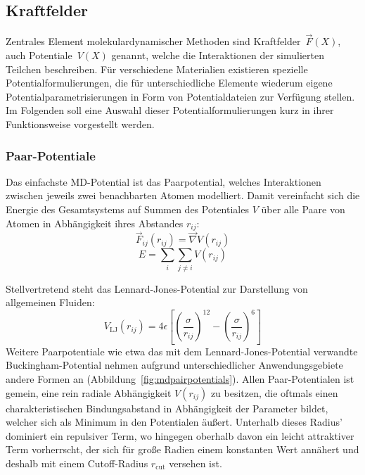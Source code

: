\subsection{Kraftfelder}
\label{mdforcefields}

Zentrales Element molekulardynamischer Methoden sind Kraftfelder~$\vec F(X)$, auch Potentiale~$V(X)$ genannt, welche die Interaktionen der simulierten Teilchen beschreiben.
Für verschiedene Materialien existieren spezielle Potentialformulierungen, die für unterschiedliche Elemente wiederum eigene Potentialparametrisierungen in Form von Potentialdateien zur Verfügung stellen.
Im Folgenden soll eine Auswahl dieser Potentialformulierungen kurz in ihrer Funktionsweise vorgestellt werden.

\subsubsection{Paar-Potentiale}

Das einfachste MD-Potential ist das Paarpotential, welches Interaktionen zwischen jeweils zwei benachbarten Atomen modelliert.
Damit vereinfacht sich die Energie des Gesamtsystems auf Summen des Potentiales $V$ über alle Paare von Atomen in Abhängigkeit ihres Abstandes $r_{ij}$:
\begin{equation}
  \vec F_{ij}(r_{ij}) = \vec\nabla V(r_{ij})
\end{equation}
\begin{equation}
  E = \sum_i\sum_{j \neq i}{V(r_{ij})}
\end{equation}

Stellvertretend steht das Lennard-Jones-Potential zur Darstellung von allgemeinen Fluiden:
\begin{equation}
  V_\text{LJ}(r_{ij}) = 4 \epsilon \left[\left(\frac{\sigma}{r_{ij}}\right)^{12} - \left(\frac{\sigma}{r_{ij}}\right)^{6}\right]
\end{equation}
Weitere Paarpotentiale wie etwa das mit dem Lennard-Jones-Potential verwandte Bucking\-ham-Potential nehmen aufgrund unterschiedlicher Anwendungsgebiete andere Formen an (Abbildung~\ref{fig:mdpairpotentials}).
Allen Paar-Potentialen ist gemein, eine rein radiale Abhängigkeit $V(r_{ij})$ zu besitzen, die oftmals einen charakteristischen Bindungsabstand in Abhängigkeit der Parameter bildet, welcher sich als Minimum in den Potentialen äußert.
Unterhalb dieses Radius' dominiert ein repulsiver Term, wo hingegen oberhalb davon ein leicht attraktiver Term vorherrscht, der sich für große Radien einem konstanten Wert annähert und deshalb mit einem Cutoff-Radius $r_\text{cut}$ versehen ist.

